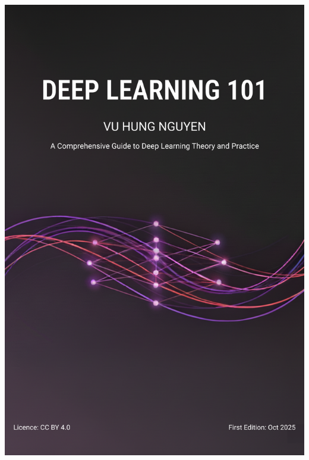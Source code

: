 \documentclass[10pt,\papersize,twoside,openright]{book}
\begin{document}
{{{{{{{{                \includegraphics[width=\paperwidth,height=\paperheight]{images/DeepLearning101-cover-trade.png}%
              }{%
}}}}}}}}
\end{document}
